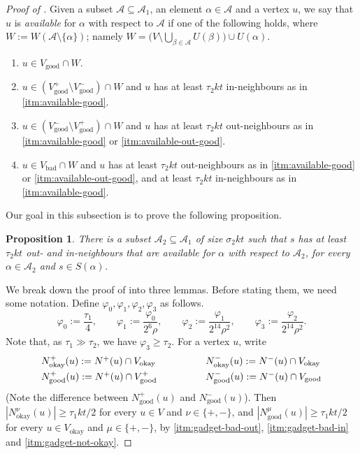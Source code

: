 \documentclass[english]{article}
\theoremstyle{plain}
\newtheorem{proposition}[theorem]{Proposition}
\theoremstyle{remark}
\let\phi\varphi
\def \Np {N^+}
\def \Nm {N^-}
\def \Vgp {V_{\good}^+}
\def \Vgp {V_{\good}^+}
\def \Vgm {V_{\good}^-}
\def \Vo {V_{\okay}}
\def \Vg {V_{\good}}
\def \Vb {V_{\bad}}
\def \Vgm {V_{\good}^-}
\def \Nmu{N^{\mu}_{\good}}
\def \Nnuo{N^{\nu}_{\okay}}
\def \Npo{N^+_{\okay}}
\def \Nmo{N^-_{\okay}}
\def \Npg{N^+_{\good}}
\def \Nmg{N^-_{\good}}
\def \Np {N^+}
\def \Nm {N^-}
\newcommand{\A}{\mathcal{A}}
\DeclareMathOperator{\bad}{bad}
\DeclareMathOperator{\good}{good}
\DeclareMathOperator{\okay}{okay}
\begin{document}
\begin{proof}[Proof of ]
		Given a subset $\A \subseteq \A_1$, an element $\alpha \in \A$ and a vertex $u$, we say that $u$ is \emph{available} for $\alpha$ with respect to $\A$ if one of the following holds, where $W := W(\A \setminus \{\alpha\})$; namely $W = \big(V \setminus \bigcup_{\beta \in \A} U(\beta)\big) \cup U(\alpha)$.


		\begin{enumerate}[label = \rm(A\arabic*)]
			\item \label{itm:available-good}
				$u \in \Vg \cap W$.
			\item \label{itm:available-out-good}
				$u \in (\Vgp \setminus \Vgm) \cap W$ and $u$ has at least $\tau_2 kt$ in-neighbours as in \ref{itm:available-good}.
			\item \label{itm:available-in-good}
				$u \in (\Vgm \setminus \Vgp) \cap W$ and $u$ has at least $\tau_2 kt$ out-neighbours as in \ref{itm:available-good} or \ref{itm:available-out-good}.
			\item \label{itm:available-bad}
				$u \in \Vb \cap W$ and $u$ has at least $\tau_2 kt$ out-neighbours as in \ref{itm:available-good} or \ref{itm:available-out-good}, and at least $\tau_2 kt$ in-neighbours as in \ref{itm:available-good}.
		\end{enumerate}

		Our goal in this subsection is to prove the following proposition.

		\begin{proposition} \label{prop:available}
			There is a subset $\A_2 \subseteq \A_1$ of size $\sigma_2 kt$ such that $s$ has at least $\tau_2 kt$ out- and in-neighbours that are available for $\alpha$ with respect to $\A_2$, for every $\alpha \in \A_2$ and $s \in S(\alpha)$.
		\end{proposition}

		We break down the proof of  into three lemmas. Before stating them, we need some notation.
		Define $\phi_0, \phi_1, \phi_2, \phi_3$ as follows.
		\begin{equation*}
			\phi_0 := \frac{\tau_1}{4}, \qquad
			\phi_1 := \frac{\phi_0}{2^{6}\rho}, \qquad
			\phi_2 := \frac{\phi_1}{2^{14}\rho^2}, \qquad
			\phi_3 := \frac{\phi_2}{2^{14}\rho^2}. 
		\end{equation*}
		Note that, as $\tau_1 \gg \tau_2$, we have $\phi_3 \ge \tau_2$.
		For a vertex $u$, write 
		\begin{align*}
			\begin{array}{ll}
				\Npo(u) := \Np(u) \cap \Vo \qquad \qquad
				&\Nmo(u) := \Nm(u) \cap \Vo \vspace{3pt}\\
				\Npg(u) := \Np(u) \cap \Vgp \qquad \qquad
				&\Nmg(u) := \Nm(u) \cap \Vg
			\end{array}
		\end{align*}
		(Note the difference between $\Npg(u)$ and $\Nmg(u)$).
		Then $|\Nnuo(u)| \ge \tau_1 kt / 2$ for every $u \in V$ and $\nu \in \{+, -\}$, and $|\Nmu(u)| \ge \tau_1 kt / 2$ for every $u \in \Vo$ and $\mu \in \{+, -\}$, 
		by \ref{itm:gadget-bad-out}, \ref{itm:gadget-bad-in} and \ref{itm:gadget-not-okay}.


\end{proof}
\end{document}
